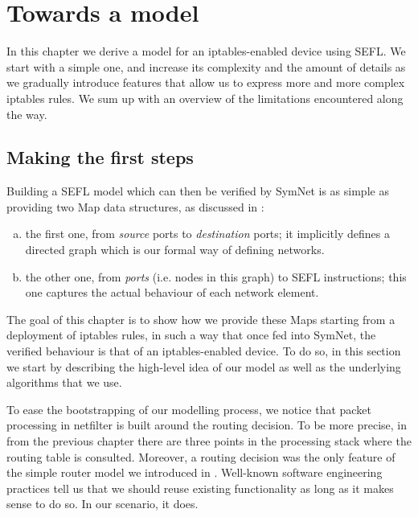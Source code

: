 \chapter{Towards a model}\label{chapter:model}
In this chapter we derive a model for an iptables-enabled device using SEFL.
We start with a simple one, and increase its complexity and the amount of
details as we gradually introduce features that allow us to express more and
more complex iptables rules.  We sum up with an overview of the limitations
encountered along the way.


\section{Making the first steps}\label{sec:first-steps}

Building a SEFL model which can then be verified by SymNet is as simple as
providing two Map data structures, as discussed in
:
\begin{enumerate}[a)]
  \item the first one, from \emph{source} ports to \emph{destination} ports; it
    implicitly defines a directed graph which is our formal way of defining
    networks.
  \item the other one, from \emph{ports} (i.e. nodes in this graph) to SEFL
    instructions; this one captures the actual behaviour of each network
    element.
\end{enumerate}

The goal of this chapter is to show how we provide these Maps starting from a
deployment of iptables rules, in such a way that once fed into SymNet, the
verified behaviour is that of an iptables-enabled device.  To do so, in this
section we start by describing the high-level idea of our model as well as the
underlying algorithms that we use.

\bigskip

To ease the bootstrapping of our modelling process, we notice that packet
processing in netfilter is built around the routing decision.  To be more
precise, in  from the previous
chapter there are three points in the processing stack where the routing table
is consulted.  Moreover, a routing decision was the only feature of the simple
router model we introduced in .
Well-known software engineering practices tell us that we should reuse existing
functionality as long as it makes sense to do so.  In our scenario, it does.


